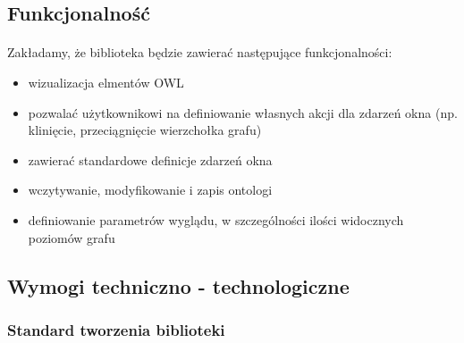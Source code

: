 \documentclass[a4paper,10pt]{article}
\begin{document}
\subsection{Funkcjonalność}
\paragraph{} Zakładamy, że biblioteka będzie zawierać następujące funkcjonalności:
\begin{itemize}
 	\item wizualizacja elmentów OWL 
	\item pozwalać użytkownikowi na definiowanie własnych akcji dla zdarzeń okna (np. klinięcie, przeciągnięcie wierzchołka grafu)
	\item zawierać standardowe definicje zdarzeń okna
	\item wczytywanie, modyfikowanie i zapis ontologi
	\item definiowanie parametrów wyglądu, w szczególności ilości widocznych poziomów grafu 
\end{itemize}



\subsection{Wymogi techniczno - technologiczne}
\subsubsection{Standard tworzenia biblioteki}
\end{document}
